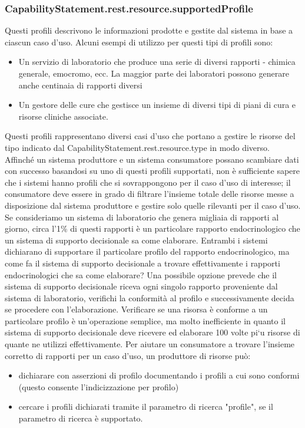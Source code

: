 \documentclass[a4paper]{article}
\begin{document}
\subsubsection*{CapabilityStatement.rest.resource.supportedProfile}
Questi profili descrivono le informazioni prodotte e gestite dal sistema in base a ciascun caso d'uso. Alcuni esempi di utilizzo per questi tipi di profili sono:
\begin{itemize}
    \item Un servizio di laboratorio che produce una serie di diversi rapporti - chimica generale, emocromo, ecc. La maggior parte dei laboratori possono generare anche centinaia di rapporti diversi
    \item Un gestore delle cure che gestisce un insieme di diversi tipi di piani di cura e risorse cliniche associate.
\end{itemize}
Questi profili rappresentano diversi casi d'uso che portano a gestire le risorse del tipo indicato dal CapabilityStatement.rest.resource.type in modo diverso.
Affinché un sistema produttore e un sistema consumatore possano scambiare dati con successo basandosi su uno di questi profili supportati, non è sufficiente sapere che i sistemi hanno profili che si sovrappongono per il caso d'uso di interesse; il consumatore deve essere in grado di filtrare l'insieme totale delle risorse messe a disposizione dal sistema produttore e gestire solo quelle rilevanti per il caso d'uso.
Se consideriamo un sistema di laboratorio che genera migliaia di rapporti al giorno, circa l'1\%  di questi rapporti è un particolare rapporto endocrinologico che un sistema di supporto decisionale sa come elaborare. Entrambi i sistemi dichiarano di supportare il particolare profilo del rapporto endocrinologico, ma come fa il sistema di supporto decisionale a trovare effettivamente i rapporti endocrinologici che sa come elaborare?
Una possibile opzione prevede che il sistema di supporto decisionale riceva ogni singolo rapporto proveniente dal sistema di laboratorio, verifichi la conformità al profilo e successivamente decida se procedere con l'elaborazione. Verificare se una risorsa è conforme a un particolare profilo è un'operazione semplice, ma molto inefficiente in quanto il sistema di supporto decisionale deve ricevere ed elaborare 100 volte pi`u risorse di quante ne utilizzi effettivamente.
Per aiutare un consumatore a trovare l'insieme corretto di rapporti per un caso d'uso, un produttore di risorse può:
\begin{itemize}
    \item dichiarare con asserzioni di profilo documentando i profili a cui sono conformi (questo consente l'indicizzazione per profilo)
    \item cercare i profili dichiarati tramite il parametro di ricerca "profile", se il parametro di ricerca è supportato.
\end{itemize}
\end{document}
